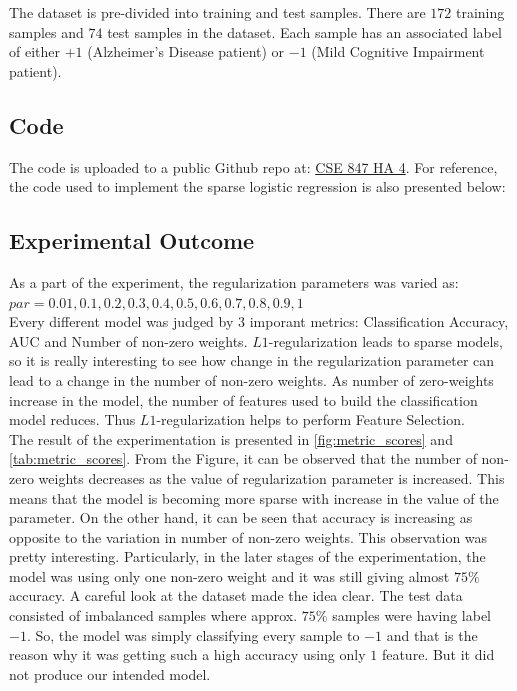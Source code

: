 \documentclass[11pt]{article}
\begin{document}
The dataset is pre-divided into training and test samples. There are $172$ training samples and $74$ test samples in the dataset. Each sample has an associated label of either $+1$ (Alzheimer's Disease patient) or $-1$ (Mild Cognitive Impairment patient).  	

\subsection{Code}
The code is uploaded to a public Github repo at: \href{https://github.com/Ritam-Guha/MSU-Courses/tree/master/CSE\%20847\%20(Machine\%20Learning)/Assignments/HA4}{CSE 847 HA 4}. For reference, the code used to implement the sparse logistic regression is also presented below:


\subsection{Experimental Outcome}

As a part of the experiment, the regularization parameters was varied as:\\ 
$par = 0.01, 0.1, 0.2, 0.3, 0.4, 0.5, 0.6, 0.7, 0.8, 0.9, 1$\\
Every different model was judged by $3$ imporant metrics: Classification Accuracy, AUC and Number of non-zero weights. $L1$-regularization leads to sparse models, so it is really interesting to see how change in the regularization parameter can lead to a change in the number of non-zero weights. As number of zero-weights increase in the model, the number of features used to build the classification model reduces. Thus $L1$-regularization helps to perform Feature Selection.\\

The result of the experimentation is presented in \autoref{fig:metric_scores} and \autoref{tab:metric_scores}. From the Figure, it can be observed that the number of non-zero weights decreases as the value of regularization parameter is increased. This means that the model is becoming more sparse with increase in the value of the parameter. On the other hand, it can be seen that accuracy is increasing as opposite to the variation in number of non-zero weights. This observation was pretty interesting. Particularly, in the later stages of the experimentation, the model was using only one non-zero weight and it was still giving almost $75\%$ accuracy. A careful look at the dataset made the idea clear. The test data consisted of imbalanced samples where approx. $75\%$ samples were having label $-1$. So, the model was simply classifying every sample to $-1$ and that is the reason why it was getting such a high accuracy using only $1$ feature. But it did not produce our intended model.\\
\end{document}
